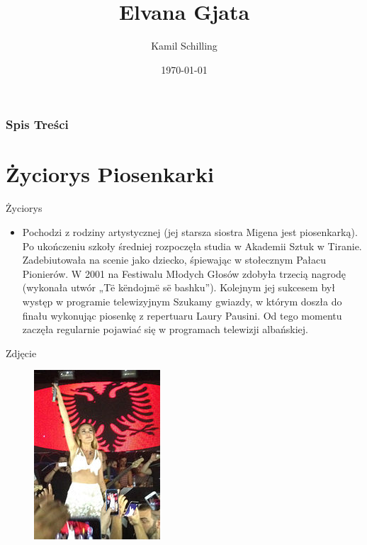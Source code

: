 \documentclass{beamer}
\title{Elvana Gjata}
\author{Kamil Schilling}
\institute{UWM}
\date{\today}
\begin{document}
\frame{\titlepage}



\begin{frame}
\frametitle{Spis Treści}
\tableofcontents
\end{frame}

\section{Życiorys Piosenkarki}
\begin{frame}{Życiorys}
\begin {itemize}
\item Pochodzi z rodziny artystycznej (jej starsza siostra Migena jest piosenkarką). Po ukończeniu szkoły średniej rozpoczęła studia w Akademii Sztuk w Tiranie.
Zadebiutowała na scenie jako dziecko, śpiewając w stołecznym Pałacu Pionierów. W 2001 na Festiwalu Młodych Głosów zdobyła trzecią nagrodę (wykonała utwór „Të këndojmë së bashku”). Kolejnym jej sukcesem był występ w programie telewizyjnym Szukamy gwiazdy, w którym doszła do finału wykonując piosenkę z repertuaru Laury Pausini. Od tego momentu zaczęła regularnie pojawiać się w programach telewizji albańskiej.
\end {itemize}
\end{frame}


\begin{frame}{Zdjęcie}

\begin{figure}[here]
\begin{center}
\includegraphics[scale=0.4]{elvana.jpg}
\end{center}
\end{figure}

\end{frame}
\end{document}

